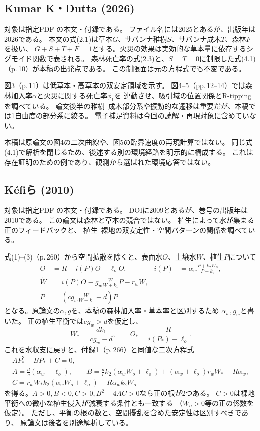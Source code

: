 \documentclass[a4paper,11pt]{ltjsarticle}
\begin{document}
\subsection{Kumar K・Dutta (2026)}
対象は指定PDF  の本文・付録である。
ファイル名には2025とあるが、出版年は2026である。
本文の式(2.1)は草本$G$、サバンナ稚樹$S$、サバンナ成木$T$、森林$F$を扱い、
$G+S+T+F=1$とする。火災の効果は実効的な草本量に依存するシグモイド関数で表される。
森林死亡率の式(2.3)と、$S=T=0$に制限した式(4.1)（p.\,10）が本稿の出発点である。
この制限面は元の方程式でも不変である。

図3（p.\,11）は低草本・高草本の双安定領域を示す。
図4--5（pp.\,12--14）では森林加入率$\alpha$と火災に関する死亡率$\phi_1$を
連動させ、吸引域の位置関係とR-tippingを調べている。
論文後半の稚樹--成木部分系や振動的な遷移は重要だが、本稿では1自由度の部分系に絞る。
電子補足資料は今回の読解・再現対象に含めていない。

本稿は原論文の図4の二次曲線や、図5の臨界速度の再現計算ではない。
同じ式(4.1)で解析を閉じるため、後述する別の環境経路を明示的に構成する。
これは存在証明のための例であり、観測から選ばれた環境応答ではない。

\subsection{Kéfiら (2010)}
対象は指定PDF  の本文・付録である。
DOIに2009とあるが、巻号の出版年は2010である。
この論文\cite{kefi}は森林と草本の競合ではない。
植生によって水が集まる正のフィードバックと、
植生--裸地の双安定性・空間パターンの関係を調べている。

式(1)--(3)（p.\,260）から空間拡散を除くと、表面水$O$、土壌水$W$、植生$P$について
\begin{align}
 \dot O&=R-i(P)O-\ell_o O,&
 i(P)&=\alpha_w\frac{P+k_2 W_o}{P+k_2},\label{eq:kefiO}\\
 \dot W&=i(P)O-g_w\frac{W}{W+k_1}P-r_wW,\\
 \dot P&=\left(cg_w\frac{W}{W+k_1}-d\right)P
\end{align}
となる。原論文の$\alpha,g$を、本稿の森林加入率・草本率と区別するため
$\alpha_w,g_w$と書いた。
正の植生平衡では$cg_w>d$を仮定し、
\[
 W_*=\frac{dk_1}{cg_w-d},\qquad O_*=\frac{R}{i(P_*)+\ell_o}.
\]
これを水収支に戻すと、付録1（p.\,266）と同値な二次方程式
\begin{gather}
 A P_*^2+B P_*+C=0,\\
 A=\frac dc(\alpha_w+\ell_o),\qquad
 B=\frac dc k_2(\alpha_w W_o+\ell_o)
      +(\alpha_w+\ell_o)r_wW_*-R\alpha_w,\nonumber\\
 C=r_wW_*k_2(\alpha_w W_o+\ell_o)-R\alpha_w k_2 W_o
\end{gather}
を得る。$A>0,B<0,C>0,B^2-4AC>0$なら正の根が2つある。
$C>0$は裸地平衡への微小な植生侵入が減衰する条件とも一致する
（$W_o>0$等の正の係数を仮定）。
ただし、平衡の根の数と、空間擾乱を含めた安定性は区別すべきであり、
原論文は後者を別途解析している。
\end{document}
